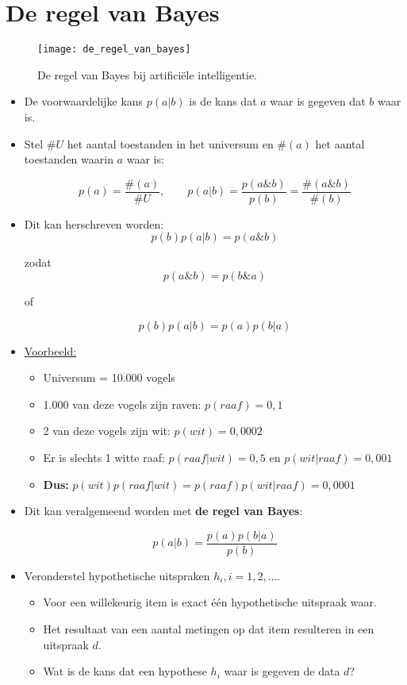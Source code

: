 \section{De regel van Bayes}
\begin{figure}[t]
	\centering
	\texttt{[image: de\_regel\_van\_bayes]}
	\caption{De regel van Bayes bij artificiële intelligentie.}
\end{figure}
\begin{itemize}
	\item De voorwaardelijke kans $p(a|b)$ is de kans dat $a$ waar is gegeven dat $b$ waar is.
	\item Stel $\#U$ het aantal toestanden in het universum en $\#(a)$ het aantal toestanden waarin $a$ waar is:
	
	$$p(a) = \frac{\#(a)}{\#U}, \qquad p(a|b) = \frac{p(a\& b)}{p(b)} = \frac{\#(a\& b)}{\#(b)}$$
	
	\item Dit kan herschreven worden:
	$$p(b)p(a|b) = p(a\& b)$$
	
	zodat 
	$$p(a\& b) = p(b \& a)$$
	
	of 
	
	$$p(b)p(a|b) = p(a)p(b|a)$$
	
	\item \underline{Voorbeeld:} 
	\begin{itemize}
		\item Universum = 10.000 vogels
		\item 1.000 van deze vogels zijn raven: $p(raaf) = 0,1$
		\item 2 van deze vogels zijn wit: $p(wit) = 0,0002$
		\item Er is slechts 1 witte raaf: $p(raaf|wit) = 0,5$ en $p(wit|raaf) = 0,001$ 
		
		\item \textbf{Dus:} $p(wit)p(raaf|wit) = p(raaf)p(wit|raaf) = 0,0001$
	\end{itemize}
	\item Dit kan veralgemeend worden met \textbf{de regel van Bayes}:
	
	$$p(a|b) = \frac{p(a)p(b|a)}{p(b)}$$
	
	\item Veronderstel hypothetische uitspraken $h_i, i = 1, 2, ...$.
	\begin{itemize}
		\item Voor een willekeurig item is exact één hypothetische uitspraak waar.
		\item Het resultaat van een aantal metingen op dat item resulteren in een uitspraak $d$.
		\item Wat is de kans dat een hypothese $h_i$ waar is gegeven de data $d$?
		

\end{itemize}
\end{itemize}
